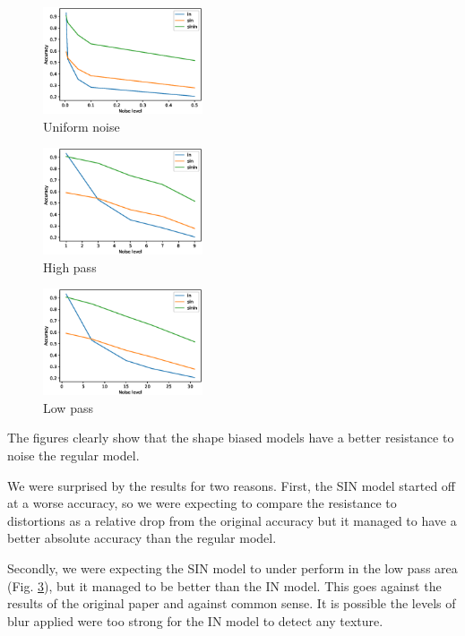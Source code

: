 \documentclass{article}
\begin{document}
\begin{figure}[h!]
\centering
\includegraphics[width = 0.42\textwidth]{imgs/uniform}
\caption{Uniform noise}
\label{uniform_noise}
\end{figure}

\begin{figure}[h!]
\centering
\includegraphics[width = 0.42\textwidth]{imgs/high_pass}
\caption{High pass}
\label{high_pass}
\end{figure}

\begin{figure}[h!]
\centering
\includegraphics[width = 0.42\textwidth]{imgs/low_pass}
\caption{Low pass}
\label{low_pass}
\end{figure}

\noindent
The figures clearly show that the shape biased models have a better 
resistance to noise the regular model. \medskip \par

\noindent
We were surprised by the results for two reasons.
First, the SIN model started off at a worse accuracy, 
so we were expecting to compare the resistance to distortions as 
a relative drop from the original accuracy but it managed to have a better absolute accuracy 
than the regular model. \medskip \par

\noindent
Secondly, we were expecting the SIN model to under perform in the low pass area (Fig. \ref{low_pass}), but it managed to be better than the IN model. 
This goes against the results of the original paper and against common sense. 
It is possible the levels of blur applied were too strong for the IN model to detect any texture.
\end{document}
